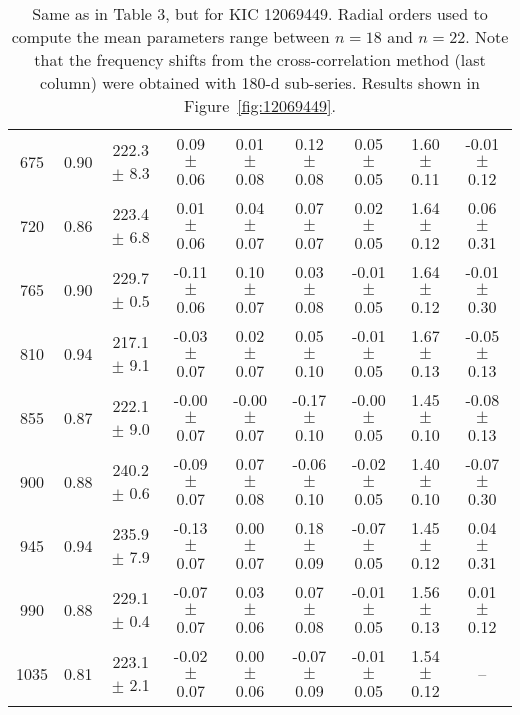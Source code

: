 \documentclass[twocolumn]{aastex61}%
\begin{document}
\begin{table*}[ht]
\begin{tabular}{ccc|ccccc|c}
675 & 0.90 & 222.3 $\pm$ 8.3 & 0.09 $\pm$ 0.06 & 0.01 $\pm$ 0.08 & 0.12 $\pm$ 0.08 & 0.05 $\pm$ 0.05 & 1.60 $\pm$ 0.11 & -0.01 $\pm$ 0.12\\
720 & 0.86 & 223.4 $\pm$ 6.8 & 0.01 $\pm$ 0.06 & 0.04 $\pm$ 0.07 & 0.07 $\pm$ 0.07 & 0.02 $\pm$ 0.05 & 1.64 $\pm$ 0.12 & 0.06 $\pm$ 0.31\\
765 & 0.90 & 229.7 $\pm$ 0.5 & -0.11 $\pm$ 0.06 & 0.10 $\pm$ 0.07 & 0.03 $\pm$ 0.08 & -0.01 $\pm$ 0.05 & 1.64 $\pm$ 0.12 & -0.01 $\pm$ 0.30\\
810 & 0.94 & 217.1 $\pm$ 9.1 & -0.03 $\pm$ 0.07 & 0.02 $\pm$ 0.07 & 0.05 $\pm$ 0.10 & -0.01 $\pm$ 0.05 & 1.67 $\pm$ 0.13 & -0.05 $\pm$ 0.13\\
855 & 0.87 & 222.1 $\pm$ 9.0 & -0.00 $\pm$ 0.07 & -0.00 $\pm$ 0.07 & -0.17 $\pm$ 0.10 & -0.00 $\pm$ 0.05 & 1.45 $\pm$ 0.10 & -0.08 $\pm$ 0.13\\
900 & 0.88 & 240.2 $\pm$ 0.6 & -0.09 $\pm$ 0.07 & 0.07 $\pm$ 0.08 & -0.06 $\pm$ 0.10 & -0.02 $\pm$ 0.05 & 1.40 $\pm$ 0.10 & -0.07 $\pm$ 0.30\\
945 & 0.94 & 235.9 $\pm$ 7.9 & -0.13 $\pm$ 0.07 & 0.00 $\pm$ 0.07 & 0.18 $\pm$ 0.09 & -0.07 $\pm$ 0.05 & 1.45 $\pm$ 0.12 & 0.04 $\pm$ 0.31\\
990 & 0.88 & 229.1 $\pm$ 0.4 & -0.07 $\pm$ 0.07 & 0.03 $\pm$ 0.06 & 0.07 $\pm$ 0.08 & -0.01 $\pm$ 0.05 & 1.56 $\pm$ 0.13 & 0.01 $\pm$ 0.12\\
1035 & 0.81 & 223.1 $\pm$ 2.1 & -0.02 $\pm$ 0.07 & 0.00 $\pm$ 0.06 & -0.07 $\pm$ 0.09 & -0.01 $\pm$ 0.05 & 1.54 $\pm$ 0.12 & --\\
\end{tabular}
\caption{Same as in Table 3, but for KIC 12069449. {Radial orders used to compute the mean parameters range between $n=18$ and $n=22$.} Note that the frequency shifts from the cross-correlation method (last column) were obtained with 180-d sub-series. Results shown in Figure~\ref{fig:12069449}.}\label{tab:12069449}
\end{table*}
\end{document}
